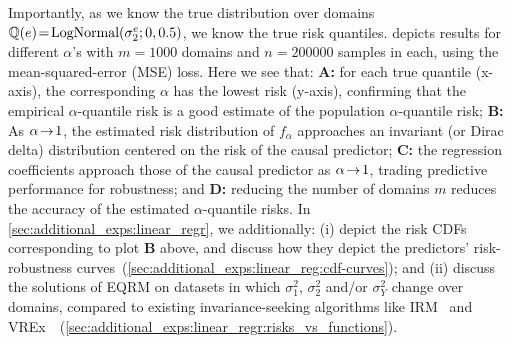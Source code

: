 \documentclass{article}
\begin{document}
Importantly, as we know the true distribution over domains $\mathbb{Q}(e)\! =\! \text{LogNormal}(\sigma_2^e ;0, 0.5)$, we know the true risk quantiles.  depicts results for different $\alpha$'s with $m\! =\! 1000$ domains and $n\! =\! 200000$ samples in each, using the mean-squared-error (MSE) loss. Here we see that: \textbf{A:} for each true quantile (x-axis), the corresponding $\alpha$ has the lowest risk (y-axis), confirming that the empirical $\alpha$-quantile risk is a good estimate of the population $\alpha$-quantile risk; \textbf{B:} As $\alpha\! \to\! 1$, the estimated risk distribution of $f_{\alpha}$ approaches an invariant (or Dirac delta) distribution centered on the risk of the causal predictor; \textbf{C:} the regression coefficients approach those of the causal predictor as $\alpha\! \to\! 1$, trading predictive performance for robustness; and \textbf{D:} reducing the number of domains $m$ reduces the accuracy of the estimated $\alpha$-quantile risks. In \cref{sec:additional_exps:linear_regr}, we additionally: (i) depict the risk CDFs corresponding to plot \textbf{B} above, and discuss how they depict the predictors' risk-robustness curves~(\ref{sec:additional_exps:linear_reg:cdf-curves}); and (ii) discuss the solutions of EQRM on datasets in which $\sigma_1^2$, $\sigma_2^2$ and/or $\sigma_Y^2$ change over domains, compared to existing invariance-seeking algorithms like IRM~\citep{arjovsky2020invariant} and VREx~\citep{krueger21rex}~(\ref{sec:additional_exps:linear_regr:risks_vs_functions}).
\end{document}
